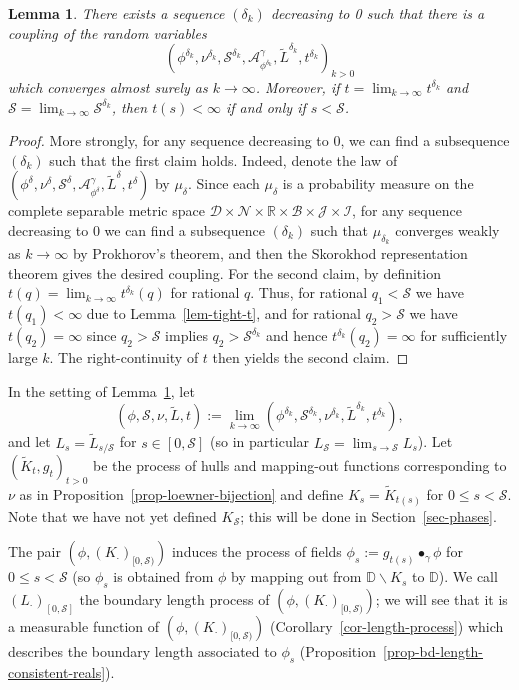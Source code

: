 \documentclass[a4paper]{article}
\numberwithin{equation}{section}
\newcommand{\D}{\mathbb{D}}
\newcommand{\R}{\mathbb{R}}
\newcommand{\cA}{\mathcal{A}}
\newcommand{\qduration}{\mathcal{S}}
\newtheorem{lemma}[theorem]{Lemma}
\theoremstyle{remark}
\numberwithin{equation}{section}
\begin{document}
\begin{lemma}\label{lem-coupling}
    There exists a sequence $(\delta_k)$ decreasing to 0 such that there is a coupling of the random variables
    $$(\phi^{\delta_k},  \nu^{\delta_k}, \qduration^{\delta_k}, \cA^\gamma_{\phi^{\delta_k}}, \tilde L^{\delta_k}, t^{\delta_k})_{k > 0}$$
    which converges almost surely as $k \to \infty$. Moreover, if $t = \lim_{k \to \infty} t^{\delta_k}$ and $\qduration = \lim_{k \to \infty} \qduration^{\delta_k}$, then $t(s) < \infty$ if and only if $s < \qduration$.
\end{lemma}
\begin{proof}
More strongly, for any sequence decreasing to $0$, we can find a subsequence $(\delta_k)$ such that the first claim holds. Indeed, denote the law of $(\phi^\delta, \nu^\delta, \qduration^\delta, \cA^\gamma_{\phi^\delta}, \tilde L^\delta, t^\delta)$ by $\mu_\delta$. Since each $\mu_\delta$ is a probability measure on the complete separable metric space $\mathcal{D} \times \mathcal{N}\times \R \times \mathcal{B} \times \mathcal J \times \mathcal I$, for any sequence decreasing to $0$ we can find a subsequence $(\delta_k)$ such that $\mu_{\delta_k}$ converges weakly as $k \to \infty$ by Prokhorov's theorem, and then the Skorokhod representation theorem gives the desired coupling. For the second claim, by definition $t(q) = \lim_{k \to \infty} t^{\delta_k}(q)$ for rational $q$. Thus, for rational $q_1 < \qduration$ we have $t(q_1) < \infty$ due to Lemma~\ref{lem-tight-t}, and for rational $q_2 > \qduration$ we have $t(q_2) = \infty$ since $q_2 > \qduration$ implies $q_2 > \qduration^{\delta_k}$ and hence $t^{\delta_k}(q_2) = \infty$ for sufficiently large $k$. The right-continuity of $t$ then yields the second claim.
\end{proof}

In the setting of Lemma~\ref{lem-coupling}, let 
\[(\phi, \qduration, \nu, \tilde L, t) := \lim_{k \to \infty}(\phi^{\delta_k}, \qduration^{\delta_k}, \nu^{\delta_k},  \tilde L^{\delta_k}, t^{\delta_k}),\]
and let $L_s = \tilde L_{s/\qduration}$ for $s \in [0,\qduration]$ (so in particular $L_\qduration = \lim_{s \to \qduration} L_s$). Let $(\tilde K_t, g_t)_{t >0}$ be the process of hulls and mapping-out functions corresponding to $\nu$ as in Proposition~\ref{prop-loewner-bijection} and define $K_s = \tilde K_{t(s)}$ for $0 \leq s < \qduration$. Note that we have not yet defined $K_\qduration$; this will be done in Section~\ref{sec-phases}.


The pair $(\phi, (K_\cdot)_{[0,\qduration)})$ induces the process of fields $\phi_s := g_{t(s)} \bullet_\gamma \phi$ for $0 \leq s < \qduration$ (so $\phi_s$ is obtained from $\phi$ by mapping out from $\D \backslash K_s$ to $\D$). 
We call $(L_\cdot)_{[0,\qduration]}$ the boundary length process of $(\phi, (K_\cdot)_{[0,\qduration)})$; we will see that it is a measurable function of $(\phi, (K_\cdot)_{[0,\qduration)})$ (Corollary~\ref{cor-length-process}) which describes the boundary length associated to $\phi_s$ (Proposition~\ref{prop-bd-length-consistent-reals}).
\end{document}
